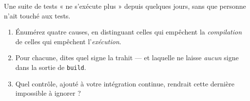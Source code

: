 \begin{nklogique}
Une suite de tests « ne s'exécute plus » depuis quelques jours, sans que personne
n'ait touché aux tests.

\begin{enumerate}
\item Énumérez quatre causes, en distinguant celles qui empêchent la
      \emph{compilation} de celles qui empêchent l'\emph{exécution}.
\item Pour chacune, dites quel signe la trahit --- et laquelle ne laisse
      \emph{aucun} signe dans la sortie de \texttt{build}.
\item Quel contrôle, ajouté à votre intégration continue, rendrait cette dernière
      impossible à ignorer ?
\end{enumerate}
\end{nklogique}

